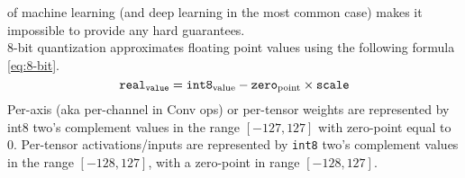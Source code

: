 of machine learning (and deep learning in the most common case) makes it
impossible to provide any hard guarantees.\cite{tflite-8bit}\\
8-bit quantization approximates floating point values using the following
formula \eqref{eq:8-bit}.
\begin{equation}
\label{eq:8-bit}
\text{\texttt{real}}_\text{\texttt{value}} = {\text{\texttt{int8}}_\text{value}-\text{\texttt{zero}}_\text{point}} \times \text{\texttt{scale}} 
\end{equation}
%
Per-axis (aka per-channel in Conv ops) or per-tensor weights are represented by
int8 two’s complement values in the range $[-127, 127]$ with zero-point equal to
0. Per-tensor activations/inputs are represented by \texttt{int8} two’s
complement values in the range $[-128, 127]$, with a zero-point in range $[-128,
127]$.
%
%
